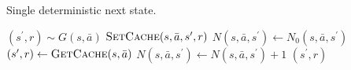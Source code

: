 %
\begin{algorithm}[!ht]
  \caption{Single deterministic next state.} 
  \label{alg:mcts-pw-deterministic-state}
  \begin{algorithmic}
    \State $(s^\prime, r) \sim G(s,\bar{a})$
    \State $\textproc{SetCache}(s, \bar{a}, s^\prime, r)$
    \State $N(s,\bar{a},s^\prime) \leftarrow N_0(s,\bar{a},s^\prime)$
  \Else
    \State $(s^\prime, r) \leftarrow \textproc{GetCache}(s,\bar{a})$
    \State $N(s,\bar{a},s^\prime) \leftarrow N(s,\bar{a},s^\prime)+1$
  \EndIf
  \State \Return $(s^\prime,r)$
  \EndFunction
  \end{algorithmic}
\end{algorithm}